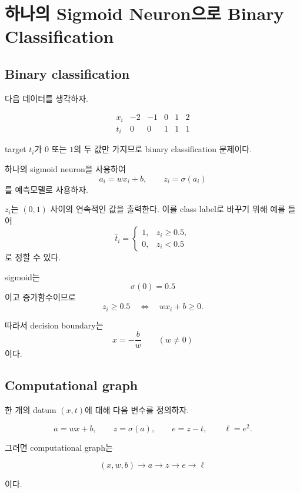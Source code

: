 \documentclass[11pt,a4paper]{article}
\newcommand{\sigmoid}{\sigma}
\begin{document}
\section{하나의 Sigmoid Neuron으로 Binary Classification}

\subsection{Binary classification}

다음 데이터를 생각하자.

\[
\begin{array}{c|ccccc}
x_i & -2 & -1 & 0 & 1 & 2\\
\hline
t_i & 0 & 0 & 1 & 1 & 1
\end{array}
\]


target $t_i$가 $0$ 또는 $1$의 두 값만 가지므로 binary classification 문제이다.

하나의 sigmoid neuron을 사용하여
\[
\boxed{
a_i=wx_i+b,
\qquad
z_i=\sigmoid(a_i)
}
\]
를 예측모델로 사용하자.

$z_i$는 $(0,1)$ 사이의 연속적인 값을 출력한다.
이를 class label로 바꾸기 위해 예를 들어
\[
\widehat t_i
=
\begin{cases}
1,&z_i\ge 0.5,\\
0,&z_i<0.5
\end{cases}
\]
로 정할 수 있다.

sigmoid는
\[
\sigmoid(0)=0.5
\]
이고 증가함수이므로
\[
z_i\ge0.5
\quad\Longleftrightarrow\quad
wx_i+b\ge0.
\]

따라서 decision boundary는
\[
\boxed{
x=-\frac{b}{w}
}
\qquad(w\neq0)
\]
이다.

\subsection{Computational graph}

한 개의 datum $(x,t)$에 대해 다음 변수를 정의하자.

\[
a=wx+b,
\qquad
z=\sigmoid(a),
\qquad
e=z-t,
\qquad
\ell=e^2.
\]

그러면 computational graph는

\[
(x,w,b)
\longrightarrow
a
\longrightarrow
z
\longrightarrow
e
\longrightarrow
\ell
\]

이다.
\end{document}
